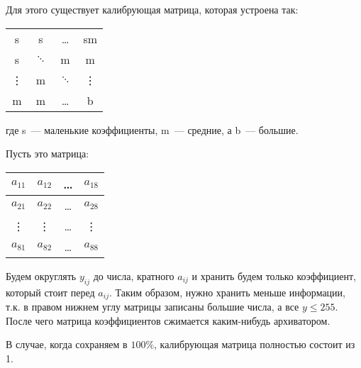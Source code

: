 Для этого существует калибрующая матрица, которая устроена так:

\vspace*{1.0em}
\begin{tabular}{|c c c c|}
    \hline
    s      & s        & \ldots   & sm     \\
    s      & $\ddots$ & m        & m      \\
    \vdots & m        & $\ddots$ & \vdots \\
    m      & m        & \ldots   & b      \\
    \hline
\end{tabular}

где s~--- маленькие коэффициенты, m~--- средние, а  b~--- большие.\\
\vspace*{1.0em}

Пусть это матрица:

\begin{tabular}{|c|c|c|c|}
    \hline
    $a_{11}$ & $a_{12}$ & \ldots & $a_{18}$ \\
    \hline
    $a_{21}$ & $a_{22}$ & \ldots & $a_{28}$ \\
    \hline
    \vdots   & \vdots   & \ldots & \vdots   \\
    \hline
    $a_{81}$ & $a_{82}$ & \ldots & $a_{88}$ \\
    \hline
\end{tabular}
\vspace*{1.0em}

Будем округлять $y_{ij}$ до числа, кратного $a_{ij}$ и хранить будем только
коэффициент, который стоит перед $a_{ij}$. Таким образом, нужно хранить меньше
информации, т.к. в правом нижнем углу матрицы записаны большие числа, а все $y
    \leq 255$. После чего матрица коэффициентов сжимается каким-нибудь архиватором.
\begin{observation}
    В случае, когда сохраняем в $100\%$, калибрующая матрица полностью состоит из 1.
\end{observation}
